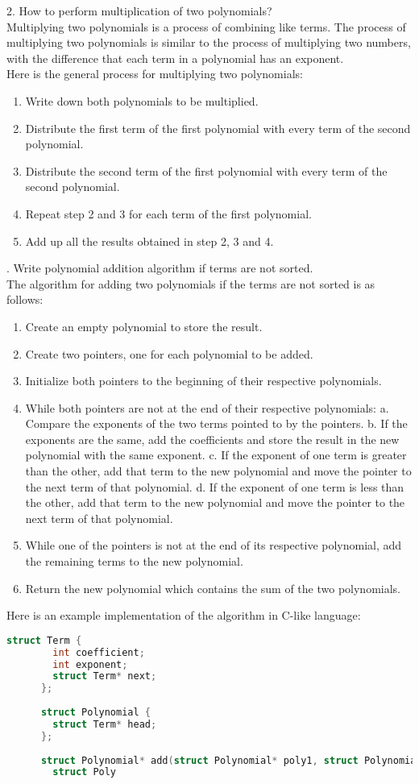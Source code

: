 \documentclass{article}
\begin{document}
2. How to perform multiplication of two polynomials?\\
Multiplying two polynomials is a process of combining like terms. The process of multiplying two polynomials is similar to the process of multiplying two numbers, with the difference that each term in a polynomial has an exponent.\\
Here is the general process for multiplying two polynomials:
\begin{enumerate}
    \item Write down both polynomials to be multiplied.
    \item Distribute the first term of the first polynomial with every term of the second polynomial.
    \item Distribute the second term of the first polynomial with every term of the second polynomial.
    \item Repeat step 2 and 3 for each term of the first polynomial.
    \item Add up all the results obtained in step 2, 3 and 4.
\end{enumerate}
. Write polynomial addition algorithm if terms are not sorted.\\
The algorithm for adding two polynomials if the terms are not sorted is as follows:
\begin{enumerate}
    \item Create an empty polynomial to store the result.
    \item Create two pointers, one for each polynomial to be added.
    \item Initialize both pointers to the beginning of their respective polynomials.
    \item While both pointers are not at the end of their respective polynomials:
    a. Compare the exponents of the two terms pointed to by the pointers.
    b. If the exponents are the same, add the coefficients and store the result in the new polynomial with the same exponent.
    c. If the exponent of one term is greater than the other, add that term to the new polynomial and move the pointer to the next term of that polynomial.
    d. If the exponent of one term is less than the other, add that term to the new polynomial and move the pointer to the next term of that polynomial.
    \item While one of the pointers is not at the end of its respective polynomial, add the remaining terms to the new polynomial.
    \item Return the new polynomial which contains the sum of the two polynomials.
\end{enumerate}
Here is an example implementation of the algorithm in C-like language:
\begin{lstlisting}[language = c, caption = example]
    struct Term {
        int coefficient;
        int exponent;
        struct Term* next;
      };
      
      struct Polynomial {
        struct Term* head;
      };
      
      struct Polynomial* add(struct Polynomial* poly1, struct Polynomial* poly2) 
        struct Poly
      
\end{lstlisting}
\end{document}
